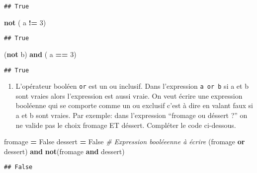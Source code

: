 \documentclass[
]{book}
\newenvironment{Shaded}{\begin{snugshade}}{\end{snugshade}}
\newcommand{\CommentTok}[1]{\textcolor[rgb]{0.56,0.35,0.01}{\textit{#1}}}
\newcommand{\DecValTok}[1]{\textcolor[rgb]{0.00,0.00,0.81}{#1}}
\newcommand{\KeywordTok}[1]{\textcolor[rgb]{0.13,0.29,0.53}{\textbf{#1}}}
\newcommand{\NormalTok}[1]{#1}
\newcommand{\OperatorTok}[1]{\textcolor[rgb]{0.81,0.36,0.00}{\textbf{#1}}}
\newcommand{\VariableTok}[1]{\textcolor[rgb]{0.00,0.00,0.00}{#1}}
\providecommand{\tightlist}{%
  \setlength{\itemsep}{0pt}\setlength{\parskip}{0pt}}
\def\tightlist{}
\begin{document}
\begin{verbatim}
## True
\end{verbatim}

\begin{Shaded}
\begin{Highlighting}[]
\KeywordTok{not}\NormalTok{ ( a }\OperatorTok{!=} \DecValTok{3}\NormalTok{)}
\end{Highlighting}
\end{Shaded}

\begin{verbatim}
## True
\end{verbatim}

\begin{Shaded}
\begin{Highlighting}[]
\NormalTok{(}\KeywordTok{not}\NormalTok{ b) }\KeywordTok{and}\NormalTok{ ( a }\OperatorTok{==} \DecValTok{3}\NormalTok{) }
\end{Highlighting}
\end{Shaded}

\begin{verbatim}
## True
\end{verbatim}

\begin{enumerate}
\def\labelenumi{\arabic{enumi}.}
\setcounter{enumi}{3}
\tightlist
\item
  L'opérateur booléen \texttt{or} est un ou inclusif. Dans l'expression \texttt{a\ or\ b} si a et b sont vraies alors l'expression est aussi vraie. On veut écrire une expression booléenne qui se comporte comme un ou exclusif c'est à dire en valant faux si a et b sont vraies. Par exemple: dans l'expression ``fromage ou déssert ?'' on ne valide pas le choix fromage ET déssert. Compléter le code ci-dessous.
\end{enumerate}

\begin{Shaded}
\begin{Highlighting}[]
\NormalTok{fromage }\OperatorTok{=} \VariableTok{False}
\NormalTok{dessert }\OperatorTok{=} \VariableTok{False}
\CommentTok{\# Expression booléeenne à écrire}
\NormalTok{(fromage }\KeywordTok{or}\NormalTok{ dessert) }\KeywordTok{and} \KeywordTok{not}\NormalTok{(fromage }\KeywordTok{and}\NormalTok{ dessert)}
\end{Highlighting}
\end{Shaded}

\begin{verbatim}
## False
\end{verbatim}
\end{document}
